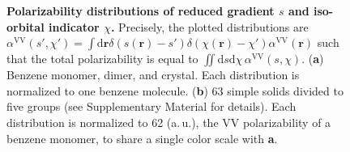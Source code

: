 \begin{figure}[t!]
\caption{\textbf{Polarizability distributions of reduced gradient $s$ and iso-orbital indicator $\chi$.}
Precisely, the plotted distributions are $\alpha^\text{VV}(s',\chi')=\int\mathrm d\mathbf r\delta(s(\mathbf r)-s')\delta(\chi(\mathbf r)-\chi')\alpha^\text{VV}(\mathbf r)$ such that the total polarizability is equal to $\iint\mathrm ds\mathrm d\chi\,\alpha^\text{VV}(s,\chi)$.
(\textbf a) Benzene monomer, dimer, and crystal.
Each distribution is normalized to one benzene molecule.
(\textbf b) 63 simple solids divided to five groups (see Supplementary Material for details).
Each distribution is normalized to 62 (a.\,u.), the VV polarizability of a benzene monomer, to share a single color scale with \textbf{a}.
}\label{fig:pol-hists}
\end{figure}

